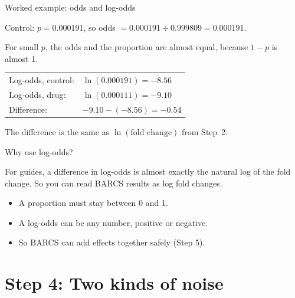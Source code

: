 \documentclass[aspectratio=169,11pt]{beamer}
\begin{document}
\begin{frame}{Worked example: odds and log-odds}
\begin{worked}[ 3]
Control: $p = 0.000191$, so odds $= 0.000191 \div 0.999809 = 0.000191$.

For small $p$, the odds and the proportion are almost equal, because $1-p$
is almost 1.

\begin{tabular}{@{}ll@{}}
Log-odds, control: & $\ln(0.000191) = -8.56$\\
Log-odds, drug:    & $\ln(0.000111) = -9.10$\\
Difference:        & $-9.10 - (-8.56) = -0.54$\\
\end{tabular}

The difference is the same as $\ln(\text{fold change})$ from Step~2.
\end{worked}
\end{frame}

\begin{frame}{Why use log-odds?}
\begin{remember}
For guides, a difference in log-odds is almost exactly the natural log of
the fold change. So you can read BARCS results as log fold changes.
\end{remember}
\medskip
\begin{itemize}
\item A proportion must stay between 0 and 1.
\item A log-odds can be any number, positive or negative.
\item So BARCS can add effects together safely (Step 5).
\end{itemize}
\end{frame}

\section{Step 4: Two kinds of noise}
\end{document}
